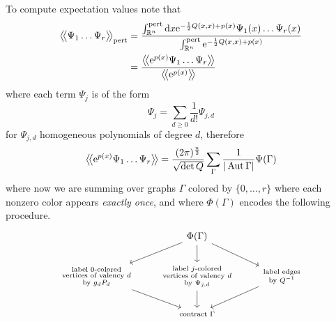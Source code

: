 To compute expectation values note that
\begin{align*}
  \big \langle \! \big \langle {\Psi_1 \dots \Psi_r} \big \rangle \! \big \rangle_\text{pert}
  &= \frac{
    \int_{\mathbb{R}^n}^\text{pert} \mathrm{d} x
    \mathrm{e}^{-\frac{1}{2} Q(x, x) + p(x)} \Psi_1(x) \dots \Psi_r (x)
  }{
    \int_{\mathbb{R}^n}^\text{pert} \mathrm{e}^{-\frac{1}{2} Q(x, x) + p(x)}
  }\\
  &= \frac{
    \big \langle \! \big \langle {\mathrm{e}^{p(x)} \Psi_1 \dots \Psi_r} \big \rangle \! \big \rangle
  }{
  \big \langle \! \big \langle {\mathrm{e}^{p(x)}} \big \rangle \! \big \rangle
  }
\end{align*}
where each term $\Psi_j$ is of the form
\begin{equation*}
  \Psi_j = \sum_{d \geq 0} \frac{1}{d!} \Psi_{j, d}
\end{equation*}
for $\Psi_{j, d}$ homogeneous polynomials of degree $d$, therefore
\begin{equation*}
  \big \langle \! \big \langle {\mathrm{e}^{p(x)} \Psi_1 \dots \Psi_r} \big \rangle \! \big \rangle
  = \frac{(2 \pi)^{\frac{n}{2}}}{\sqrt{\det Q}}
  \sum_{\Gamma} \frac{1}{|\operatorname{Aut} \Gamma|} \Psi(\Gamma)
\end{equation*}
where now we are summing over graphs $\Gamma$ colored by $\{0, \dots, r\}$ where each nonzero color appears \textit{exactly once}, and where $\Phi(\Gamma)$ encodes the following procedure.
\begin{equation*}
  \begin{tikzcd}
    & \Phi(\Gamma) \arrow[dl] \arrow[d] \arrow[dr] & \\
    \substack{\text{label } 0 \text{-colored}\\
      \text{vertices of valency } d \\
    \text{by } g_d P_d} \arrow[dr] &
    \substack{\text{label } j \text{-colored}\\
      \text{vertices of valency } d \\
      \text{by } \Psi_{j, d}} \arrow[d] &
    \substack{\text{label edges}\\
      \text{by } Q^{-1}} \arrow[dl] \\
    &\text{\scriptsize contract $\Gamma$}&
  \end{tikzcd}
\end{equation*}
